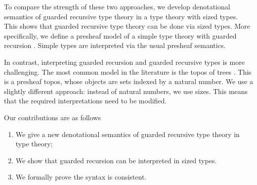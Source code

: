 




To compare the strength of these two approaches, we develop denotational semantics of guarded recursive type theory in a type theory with sized types.
This shows that guarded recursive type theory can be done via sized types.
More specifically, we define a presheaf model of a simple type theory with guarded recursion \cite{BMSS-synthetic}.
Simple types are interpreted via the usual presheaf semantics.

In contrast, interpreting guarded recursion and guarded recursive types is more challenging.
The most common model in the literature is the topos of trees \cite{BMSS-synthetic}.
This is a presheaf topos, whose objects are sets indexed by a natural number.
We use a slightly different approach: instead of natural numbers, we use sizes.
This means that the required interpretations need to be modified.

Our contributions are as follows
\begin{enumerate}
	\item We give a new denotational semantics of guarded recursive type theory in type theory;
	\item We show that guarded recursion can be interpreted in sized types.
	\item We formally prove the syntax is consistent.
\end{enumerate}

